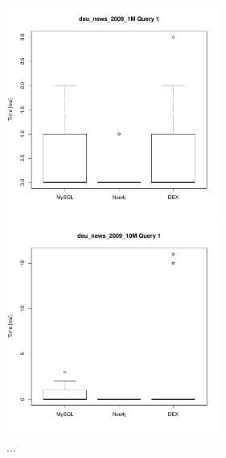 \documentclass[11pt, a4paper, oneside]{article} %
\begin{document}
\begin{appendix}
\begin{figure}[ht]
\begin{minipage}[hbt]{7cm}
	\centering
	\includegraphics[width=7cm]{../results/cold caches/images/1M_query1_boxplot}
	\caption{...}
	\label{fig:1M_query2_boxplot}
\end{minipage}
\hfill
\begin{minipage}[hbt]{7cm}
	\centering
	\includegraphics[width=7cm]{../results/cold caches/images/10M_query1_boxplot}
	\caption{...}
	\label{fig:10M_query1_boxplot}
\end{minipage}


\end{figure}
\end{appendix}
\end{document}
